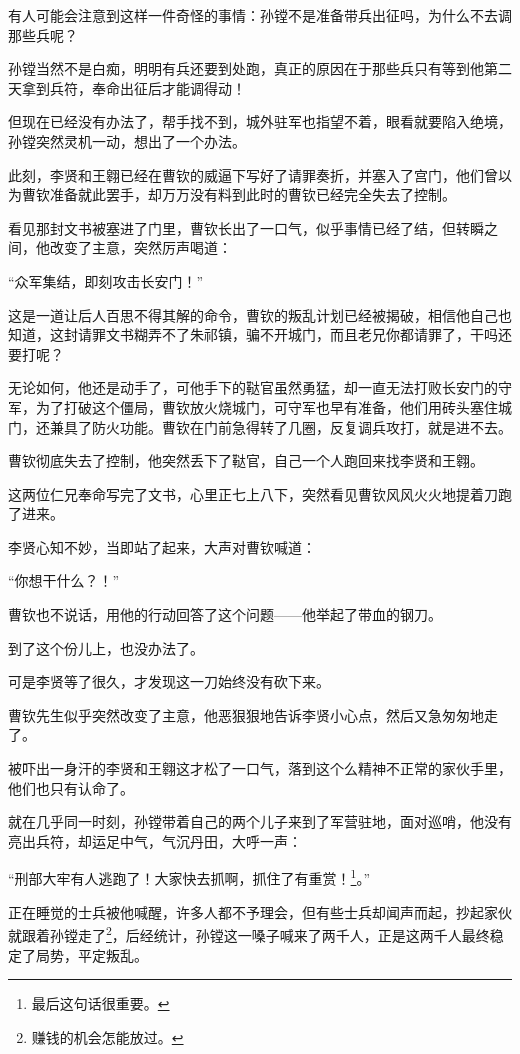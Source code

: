 \begin{multicols}{\theparacolNo}
有人可能会注意到这样一件奇怪的事情：孙镗不是准备带兵出征吗，为什么不去调那些兵呢？

孙镗当然不是白痴，明明有兵还要到处跑，真正的原因在于那些兵只有等到他第二天拿到兵符，奉命出征后才能调得动！

但现在已经没有办法了，帮手找不到，城外驻军也指望不着，眼看就要陷入绝境，孙镗突然灵机一动，想出了一个办法。

此刻，李贤和王翱已经在曹钦的威逼下写好了请罪奏折，并塞入了宫门，他们曾以为曹钦准备就此罢手，却万万没有料到此时的曹钦已经完全失去了控制。

看见那封文书被塞进了门里，曹钦长出了一口气，似乎事情已经了结，但转瞬之间，他改变了主意，突然厉声喝道：

“众军集结，即刻攻击长安门！”

这是一道让后人百思不得其解的命令，曹钦的叛乱计划已经被揭破，相信他自己也知道，这封请罪文书糊弄不了朱祁镇，骗不开城门，而且老兄你都请罪了，干吗还要打呢？

无论如何，他还是动手了，可他手下的鞑官虽然勇猛，却一直无法打败长安门的守军，为了打破这个僵局，曹钦放火烧城门，可守军也早有准备，他们用砖头塞住城门，还兼具了防火功能。曹钦在门前急得转了几圈，反复调兵攻打，就是进不去。

曹钦彻底失去了控制，他突然丢下了鞑官，自己一个人跑回来找李贤和王翱。

这两位仁兄奉命写完了文书，心里正七上八下，突然看见曹钦风风火火地提着刀跑了进来。

李贤心知不妙，当即站了起来，大声对曹钦喊道：

“你想干什么？！”

曹钦也不说话，用他的行动回答了这个问题——他举起了带血的钢刀。

到了这个份儿上，也没办法了。

可是李贤等了很久，才发现这一刀始终没有砍下来。

曹钦先生似乎突然改变了主意，他恶狠狠地告诉李贤小心点，然后又急匆匆地走了。

被吓出一身汗的李贤和王翱这才松了一口气，落到这个么精神不正常的家伙手里，他们也只有认命了。

就在几乎同一时刻，孙镗带着自己的两个儿子来到了军营驻地，面对巡哨，他没有亮出兵符，却运足中气，气沉丹田，大呼一声：

“刑部大牢有人逃跑了！大家快去抓啊，抓住了有重赏！\footnote{最后这句话很重要。}。”

正在睡觉的士兵被他喊醒，许多人都不予理会，但有些士兵却闻声而起，抄起家伙就跟着孙镗走了\footnote{赚钱的机会怎能放过。}，后经统计，孙镗这一嗓子喊来了两千人，正是这两千人最终稳定了局势，平定叛乱。


\end{multicols}
